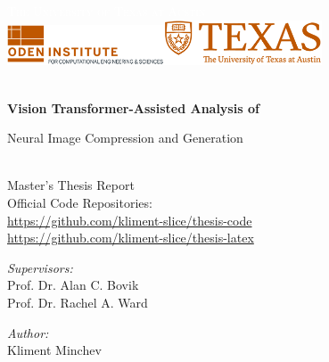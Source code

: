 \begin{titlepage}


\TITLEBOX

\begin{center}



\sffamily\textsc{\huge{\textcolor{white}{The University of Texas at Austin}}}\\[4cm]


\includegraphics[width=0.35\textwidth]{media/faculty.png}\makebox[1.5cm]{}\includegraphics[width=0.35\textwidth]{media/unilogo.png}~\\[1.5cm]



\HRule \\[0.4cm]
{
 \huge \bfseries \sffamily Vision Transformer-Assisted Analysis of
 
Neural Image Compression and Generation  \\[0.4cm] 
}

\HRule \\[0.4cm] 

\normalfont \LARGE \sffamily Master's Thesis Report \\[1.5cm]
\normalfont \large \sffamily Official Code Repositories: \\
\normalfont \large \sffamily \url{https://github.com/kliment-slice/thesis-code} \\[0.05cm]
\normalfont \large \sffamily \url{https://github.com/kliment-slice/thesis-latex} \\[1.0cm]

\noindent
\begin{minipage}{0.4\textwidth}
\begin{flushleft} \large
\emph{Supervisors:} \\
Prof. Dr. Alan C. Bovik\\
Prof. Dr. Rachel A. Ward\\
\end{flushleft}
\end{minipage}%
\begin{minipage}{0.4\textwidth}
\begin{center} \large
\emph{Author:}\\
Kliment Minchev\\
\end{center}
\end{minipage}


\end{center}
\end{titlepage}
